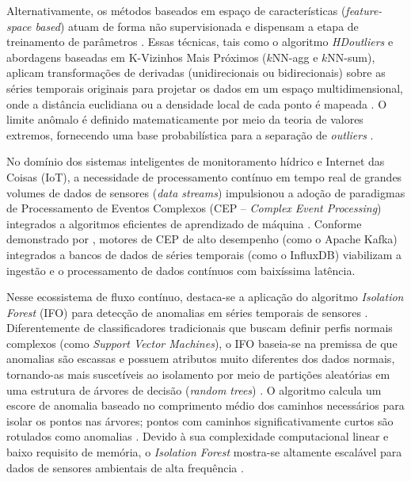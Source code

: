 Alternativamente, os métodos baseados em espaço de características (\textit{feature-space based}) atuam de forma não supervisionada e dispensam a etapa de treinamento de parâmetros \cite{leigh2019framework}. Essas técnicas, tais como o algoritmo \textit{HDoutliers} e abordagens baseadas em K-Vizinhos Mais Próximos ($k$NN-agg e $k$NN-sum), aplicam transformações de derivadas (unidirecionais ou bidirecionais) sobre as séries temporais originais para projetar os dados em um espaço multidimensional, onde a distância euclidiana ou a densidade local de cada ponto é mapeada \cite{leigh2019framework}. O limite anômalo é definido matematicamente por meio da teoria de valores extremos, fornecendo uma base probabilística para a separação de \textit{outliers} \cite{leigh2019framework}.

No domínio dos sistemas inteligentes de monitoramento hídrico e Internet das Coisas (IoT), a necessidade de processamento contínuo em tempo real de grandes volumes de dados de sensores (\textit{data streams}) impulsionou a adoção de paradigmas de Processamento de Eventos Complexos (CEP -- \textit{Complex Event Processing}) integrados a algoritmos eficientes de aprendizado de máquina \cite{sun2019building}. Conforme demonstrado por , motores de CEP de alto desempenho (como o Apache Kafka) integrados a bancos de dados de séries temporais (como o InfluxDB) viabilizam a ingestão e o processamento de dados contínuos com baixíssima latência.

Nesse ecossistema de fluxo contínuo, destaca-se a aplicação do algoritmo \textit{Isolation Forest} (IFO) para detecção de anomalias em séries temporais de sensores \cite{sun2019building}. Diferentemente de classificadores tradicionais que buscam definir perfis normais complexos (como \textit{Support Vector Machines}), o IFO baseia-se na premissa de que anomalias são escassas e possuem atributos muito diferentes dos dados normais, tornando-as mais suscetíveis ao isolamento por meio de partições aleatórias em uma estrutura de árvores de decisão (\textit{random trees}) \cite{sun2019building}. O algoritmo calcula um escore de anomalia baseado no comprimento médio dos caminhos necessários para isolar os pontos nas árvores; pontos com caminhos significativamente curtos são rotulados como anomalias \cite{sun2019building}. Devido à sua complexidade computacional linear e baixo requisito de memória, o \textit{Isolation Forest} mostra-se altamente escalável para dados de sensores ambientais de alta frequência \cite{sun2019building}.

